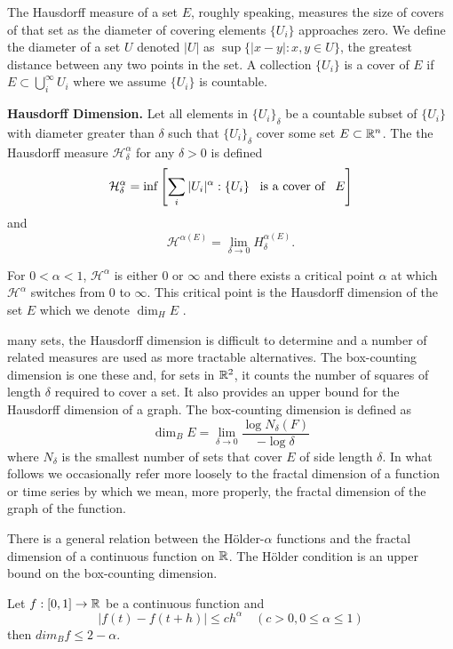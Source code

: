 The Hausdorff measure of a set $E$, roughly speaking, 
measures the size of covers of that set 
as the diameter of covering elements
$\{ U_i \}$ approaches zero. We define the diameter 
of a set $U$ denoted $|U|$ as 
$\sup \{ | x- y| : x, y \in U\}$, the greatest distance 
between any two points in the set. A collection 
$ \{ U_i \}$ is 
a cover of $E$ if $E \subset \bigcup_i^{\infty} U_i$
where we assume $\{ U_i \}$ is countable. 

\begin{defn}{\textbf{Hausdorff Dimension.} }
Let all elements in $ \{ U_i \}_{\delta}$ be a
countable subset of $\{ U_i \}$ with diameter greater 
than $\delta$ such that $\{ U_i \}_{\delta}$ cover 
some set $E \subset \mathbb R^n$. The the Hausdorff measure 
$\mathcal{H}_{\delta}^{\alpha}$ for any $\delta > 0$ 
is defined 
\begin{align*}
  \mathcal{H}_{\delta}^{\alpha} = \inf 
    \left[ \sum_i | U_i |^{\alpha} : \{ U_i \} \hspace{0.5em}\text{ is  a cover of  }\hspace{0.5em} E \right]
\end{align*}  
and 
$$
\mathcal{H}^{\alpha(E)}=\lim_{\delta\to 0} H^{\alpha(E)}_\delta.
$$

\end{defn}

For $0 < \alpha < 1$, $\mathcal{H}^{\alpha}$ is 
either $0$ or $\infty$ and there exists a critical point 
$\alpha$ at which $\mathcal{H}^{\alpha}$ switches from $0$ to 
$\infty$. This critical point is  
the Hausdorff dimension of the set $E$ 
which we denote $\dim_H E$ \cite{falconer2003}. 

\For many sets, the Hausdorff dimension is difficult to determine and a number of related measures are used as more tractable alternatives. 
The box-counting dimension is one these and, for sets in $\mathbb R^2$, 
it counts the number of squares of length $\delta$ required
to cover a set. It also provides an upper bound for the 
Hausdorff dimension of a graph. The box-counting dimension 
is defined as
\[
  \dim_B E = \lim_{\delta \to 0} \frac{ \log N_{\delta}(F)}
  {- \log \delta}
\]
where $N_{\delta}$ is the smallest number of sets 
that cover $E$ of side length $\delta$. In what follows 
we occasionally refer more 
loosely to the fractal dimension of a function 
or time series by which we mean, more properly, the 
fractal dimension of the graph of the function.  

There is a general relation between the 
H\"older-$\alpha$ functions and the fractal dimension of 
a continuous function on $\mathbb R$. The H\"older condition is an upper bound on the box-counting dimension.
\begin{prop}
  Let $f:[0, 1] \to \mathbb R$ be a continuous function 
  and 
  \[  
    |f(t) - f(t + h)| \leq ch^{\alpha} \hspace{1em} 
    (c > 0, 0 \leq \alpha \leq 1)
  \]
  then $dim_B f \leq 2 - \alpha $\cite{falconer2003}.
\end{prop}

